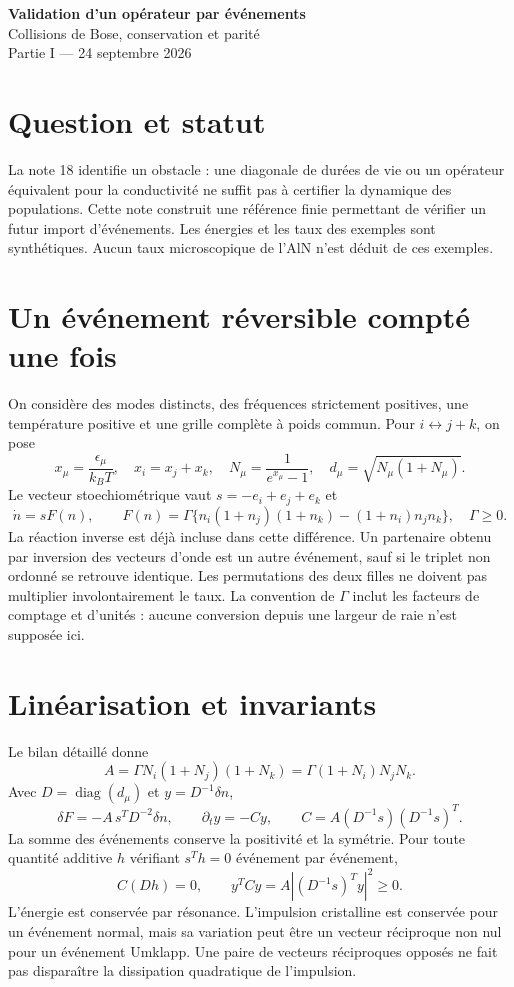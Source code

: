 \documentclass[11pt,a4paper]{article}
\begin{document}
\begin{center}
{\Large\bfseries Validation d'un opérateur par événements}\\[4pt]
{\normalsize Collisions de Bose, conservation et parité}\\[2pt]
{\small Partie I --- 24 septembre 2026}
\end{center}
\section{Question et statut}
La note 18 identifie un obstacle : une diagonale de durées de vie ou un
opérateur équivalent pour la conductivité ne suffit pas à certifier la
dynamique des populations. Cette note construit une référence finie
permettant de vérifier un futur import d'événements.
Les énergies et les taux des exemples sont synthétiques. Aucun taux
microscopique de l'AlN n'est déduit de ces exemples.

\section{Un événement réversible compté une fois}
On considère des modes distincts, des fréquences strictement positives,
une température positive et une grille complète à poids commun.
Pour $i\leftrightarrow j+k$, on pose
\[
 x_\mu=\frac{\epsilon_\mu}{k_BT},\quad x_i=x_j+x_k,\quad
 N_\mu=\frac{1}{e^{x_\mu}-1},\quad
 d_\mu=\sqrt{N_\mu(1+N_\mu)}.
\]
Le vecteur stoechiométrique vaut $s=-e_i+e_j+e_k$ et
\[
 \dot n=sF(n),\qquad
 F(n)=\Gamma\{n_i(1+n_j)(1+n_k)-(1+n_i)n_jn_k\},\quad \Gamma\ge0.
\]
La réaction inverse est déjà incluse dans cette différence. Un partenaire
obtenu par inversion des vecteurs d'onde est un autre événement, sauf
si le triplet non ordonné se retrouve identique. Les permutations des deux
filles ne doivent pas multiplier involontairement le taux.
La convention de $\Gamma$ inclut les facteurs de comptage et d'unités :
aucune conversion depuis une largeur de raie n'est supposée ici.

\section{Linéarisation et invariants}
Le bilan détaillé donne
\[
 A=\Gamma N_i(1+N_j)(1+N_k)
   =\Gamma(1+N_i)N_jN_k .
\]
Avec $D=\operatorname{diag}(d_\mu)$ et $y=D^{-1}\delta n$,
\[
 \delta F=-A\,s^TD^{-2}\delta n,\qquad
 \partial_t y=-Cy,\qquad
 C=A(D^{-1}s)(D^{-1}s)^T.
\]
La somme des événements conserve la positivité et la symétrie.
Pour toute quantité additive $h$ vérifiant $s^Th=0$ événement par événement,
\[
 C(Dh)=0,\qquad y^TCy=A|(D^{-1}s)^Ty|^2\ge0.
\]
L'énergie est conservée par résonance. L'impulsion cristalline est
conservée pour un événement normal, mais sa variation peut être un
vecteur réciproque non nul pour un événement Umklapp.
Une paire de vecteurs réciproques opposés ne fait pas disparaître
la dissipation quadratique de l'impulsion.
\end{document}
